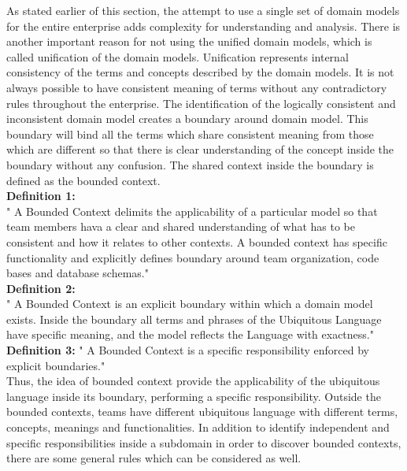 As stated earlier of this section, the attempt to use a single set of domain models for the entire enterprise adds complexity for understanding and analysis. There is another important reason for not using the unified domain models, which is called unification of the domain models. Unification represents internal consistency of the terms and concepts described by the domain models. It is not always possible to have consistent meaning of terms without any contradictory rules throughout the enterprise. The identification of the logically consistent and inconsistent domain model creates a boundary around domain model. This boundary will bind all the terms which share consistent meaning from those which are different so that there is clear understanding of the concept inside the boundary without any confusion. The shared context inside the boundary is defined as the bounded context.
\\
\textbf{Definition 1:} \label{bounded_context_definition_1}
\\
" A Bounded Context delimits the applicability of a particular model so that team members hava a clear and shared understanding of what has to be consistent and how it relates to other contexts. A bounded context has specific functionality and explicitly defines boundary around team organization, code bases and database schemas."\cite{Evans:2003aa}
\\
\textbf{Definition 2:} \label{bounded_context_definition_2}
\\
" A Bounded Context is an explicit boundary within which a domain model exists. Inside the boundary all terms and phrases of the Ubiquitous Language have specific meaning, and the model reflects the Language with exactness." \cite{Vernon:2013aa}
\\
\textbf{Definition 3:} \label{bounded_context_definition_3}
" A Bounded Context is a specific responsibility enforced by explicit boundaries." \cite{Mike:2012aa}
\\
Thus, the idea of bounded context provide the applicability of the ubiquitous language inside its boundary, performing a specific responsibility. Outside the bounded contexts, teams have different ubiquitous language with different terms, concepts, meanings and functionalities. In addition to identify independent and specific responsibilities inside a subdomain in order to discover bounded contexts, there are some general rules which can be considered as well.
